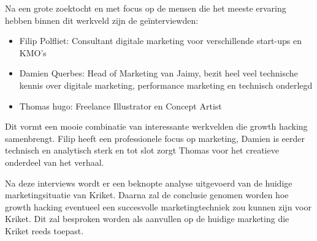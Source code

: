 Na een grote zoektocht en met focus op de mensen die het meeste ervaring hebben binnen dit werkveld zijn de geïnterviewden:
\begin{itemize} 
	\item Filip Polfliet: Consultant digitale marketing voor verschillende start-ups en KMO's
	\item Damien Querbes: Head of Marketing van Jaimy, bezit heel veel technische kennis over digitale marketing, performance marketing en technisch onderlegd
	\item Thomas hugo: Freelance Illustrator en Concept Artist
\end{itemize}

Dit vormt een mooie combinatie van interessante werkvelden die growth hacking samenbrengt. Filip heeft een professionele focus op marketing, Damien is eerder technisch en analytisch sterk en tot slot zorgt Thomas voor het creatieve onderdeel van het verhaal.

Na deze interviews wordt er een beknopte analyse uitgevoerd van de huidige marketingsituatie van Kriket. Daarna zal de conclusie genomen worden hoe growth hacking eventueel een succesvolle marketingtechniek zou kunnen zijn voor Kriket. Dit zal besproken worden als aanvullen op de huidige marketing die Kriket reeds toepast.